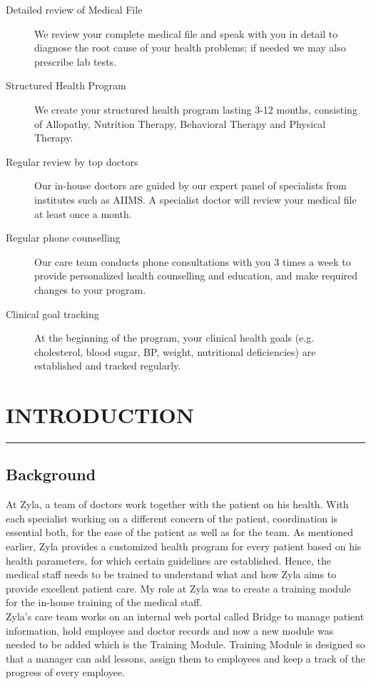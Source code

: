 \documentclass[a4paper,11pt]{article}
\begin{document}
\begin{description}
    \item[Detailed review of Medical File] We review your complete medical file and speak with you in detail to diagnose the root cause of your health problems; if needed we may also prescribe lab tests.
    \item[Structured Health Program] We create your structured health program lasting 3-12 months, consisting of Allopathy, Nutrition Therapy, Behavioral Therapy and Physical Therapy.
    \item[Regular review by top doctors] Our in-house doctors are guided by our expert panel of specialists from institutes such as AIIMS. A specialist doctor will review your medical file at least once a month.
    \item[Regular phone counselling] Our care team conducts phone consultations with you 3 times a week to provide personalized health counselling and education, and make required changes to your program.
    \item[Clinical goal tracking] At the beginning of the program, your clinical health goals (e.g. cholesterol, blood sugar, BP, weight, nutritional deficiencies) are established and tracked regularly.
\end{description}

\newpage
\tableofcontents
\newpage

\listoffigures
{} 
\listoftables
{}

\newpage
{}
\setcounter{page}{7}
\section{INTRODUCTION}
\hrule
\vspace*{5mm}
\subsection{Background}
At Zyla, a team of doctors work together with the patient on his health. With each specialist working on a different concern of the patient, coordination is essential both, for the ease of the patient as well as for the team. As mentioned earlier, Zyla provides a customized health program for every patient based on his health parameters, for which certain guidelines are established. Hence, the medical staff needs to be trained to understand what and how Zyla aims to provide excellent patient care. My role at Zyla was to create a training module for the in-house training of the medical staff.
\medskip\\
Zyla's care team works on an internal web portal called Bridge to manage patient information, hold employee and doctor records and now a new module was needed to be added which is the Training Module. Training Module is designed so that a manager can add lessons, assign them to employees and keep a track of the progress of every employee.
\end{document}
